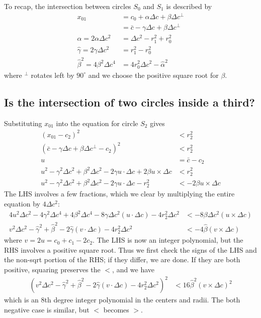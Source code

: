\documentclass[11pt]{article}
\begin{document}
To recap, the intersection between circles $S_0$ and $S_1$ is described by
\begin{align*}
x_{01} &= c_0 + \alpha \Delta c + \beta \Delta c^\perp \\
       &= \bar{c} - \gamma \Delta c + \beta \Delta c^\perp \\
\hat{\alpha} = 2 \alpha \Delta c^2 &= \Delta c^2 - r_1^2 + r_0^2 \\
\hat{\gamma} = 2 \gamma \Delta c^2 &= r_1^2 - r_0^2 \\
\hat{\beta}^2 = 4 \beta^2 \Delta c^4 &= 4 r_0^2 \Delta c^2 - \hat{\alpha}^2
\end{align*}
where $^\perp$ rotates left by $90^\circ$ and we choose the positive square root for $\beta$.

\subsection{Is the intersection of two circles inside a third?}

Substituting $x_{01}$ into the equation for circle $S_2$ gives
\begin{align*}
(x_{01} - c_2)^2 &< r_2^2 \\
(\bar{c} - \gamma \Delta c + \beta \Delta c^\perp - c_2)^2 &< r_2^2 \\
u &= \bar{c} - c_2 \\
u^2 - \gamma^2 \Delta c^2 + \beta^2 \Delta c^2 - 2\gamma u \cdot \Delta c + 2\beta u \times \Delta c &< r_2^2 \\
u^2 - \gamma^2 \Delta c^2 + \beta^2 \Delta c^2 - 2\gamma u \cdot \Delta c - r_2^2 &< -2\beta u \times \Delta c
\end{align*}
The LHS involves a few fractions, which we clear by multiplying the entire equation by $4\Delta c^2$:
\begin{align*}
4u^2 \Delta c^2 - 4\gamma^2 \Delta c^4 + 4\beta^2 \Delta c^4 - 8\gamma \Delta c^2 (u \cdot \Delta c) - 4 r_2^2 \Delta c^2 &< -8\beta \Delta c^2 (u \times \Delta c) \\
v^2 \Delta c^2 - \hat{\gamma}^2 + \hat{\beta}^2 - 2\hat{\gamma} (v \cdot \Delta c) - 4 r_2^2 \Delta c^2 &< -4 \hat{\beta} (v \times \Delta c)
\end{align*}
where $v = 2u = c_0+c_1-2c_2$.
The LHS is now an integer polynomial, but the RHS involves a positive square root.  Thus we first check the signs of the LHS and the non-sqrt portion of the RHS; if they differ, we
are done.  If they are both positive, squaring preserves the $<$, and we have
\begin{align} 
\left( v^2 \Delta c^2 - \hat{\gamma}^2 + \hat{\beta}^2 - 2\hat{\gamma} (v \cdot \Delta c) - 4 r_2^2 \Delta c^2 \right)^2 &< 16 \hat{\beta}^2 (v \times \Delta c)^2
\label{three-circles}
\end{align}
which is an 8th degree integer polynomial in the centers and radii.  The both negative case is similar, but $<$ becomes $>$.
\end{document}
